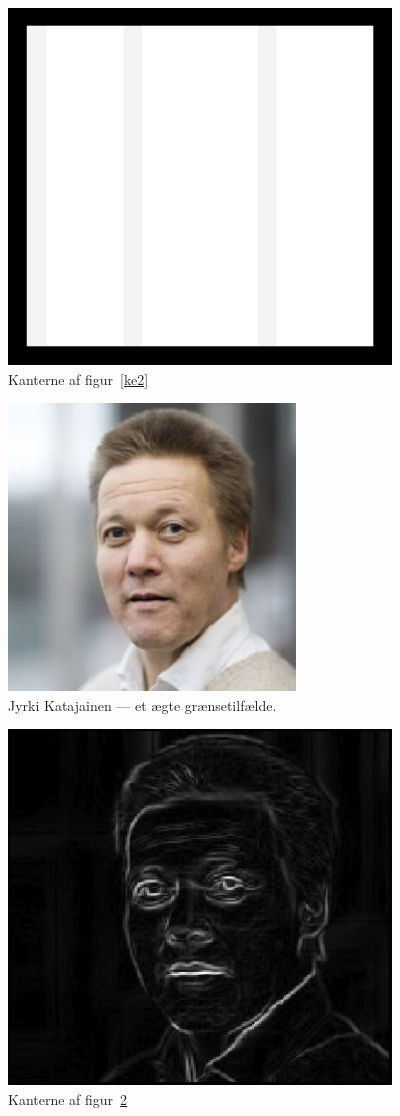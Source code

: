 \documentclass{article}
\begin{document}
	\begin{figure}
		\centering
		\includegraphics[width=4in]{test2_result.png}
		\caption{Kanterne af figur~\ref{ke2}}
		\label{ke2r}
	\end{figure}
	\begin{figure}
		\centering
		\includegraphics[width=3in]{test3.jpg}
		\caption{Jyrki Katajainen --- et ægte grænsetilfælde.}
		\label{ke3}
	\end{figure}
	\begin{figure}
		\centering
		\includegraphics[width=4in]{test3_result.jpg}
		\caption{Kanterne af figur~\ref{ke3}}
		\label{ke3r}
	\end{figure}
\end{document}
